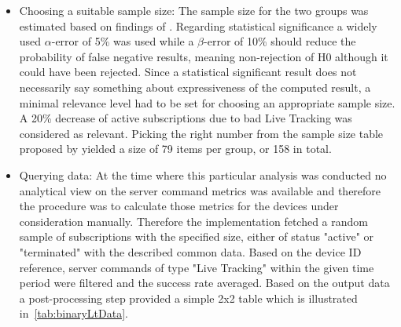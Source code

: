 \begin{enumerate}
\begin{itemize}
		\item Choosing a suitable sample size: The sample size for the two groups was estimated based on findings of \cite{campbell1995estimating}. Regarding statistical significance a widely used $\alpha$-error of 5\% was used while a $\beta$-error of 10\% should reduce the probability of false negative results, meaning non-rejection of H0 although it could have been rejected. Since a statistical significant result does not necessarily say something about expressiveness of the computed result, a minimal relevance level had to be set for choosing an appropriate sample size. A 20\% decrease of active subscriptions due to bad Live Tracking was considered as relevant. Picking the right number from the sample size table proposed by \cite{campbell1995estimating} yielded a size of 79 items per group, or 158 in total. 
		\item Querying data: At the time where this particular analysis was conducted no analytical view on the server command metrics was available and therefore the procedure was to calculate those metrics for the devices under consideration manually. Therefore the implementation fetched a random sample of subscriptions with the specified size, either of status "active" or "terminated" with the described common data. Based on the device ID reference, server commands of type "Live Tracking" within the given time period were filtered and the success rate averaged. Based on the output data a post-processing step provided a simple 2x2 table which is illustrated in~\ref{tab:binaryLtData}. 
		

\end{itemize}
\end{enumerate}
